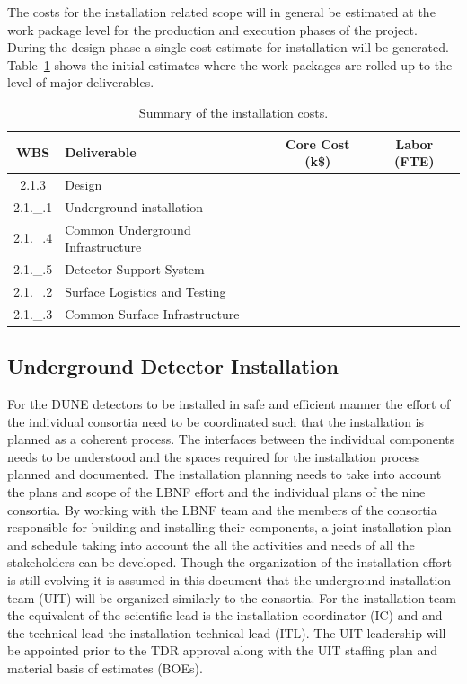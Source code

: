 The costs for the installation related scope will in general be
estimated at the work package level for the production and execution
phases of the project. During the design phase a single cost estimate
for installation will be generated. Table~\ref{Instal-Cost} shows the
initial estimates where the work packages are rolled up to the level
of major deliverables.
\begin{table}[h]
  \begin{center}
    \begin{tabular}{|c|l|c|c|}      \hline
      WBS&Deliverable&Core Cost (k\$)&Labor (FTE)\\      \hline \hline
      2.1.3&Design&&\\      \hline
      2.1.\_.1&Underground installation&&\\      \hline
      2.1.\_.4&Common Underground  Infrastructure&&\\      \hline
      2.1.\_.5& Detector Support System&&\\      \hline
      2.1.\_.2&Surface Logistics and Testing&&\\ \hline
      2.1.\_.3&Common Surface Infrastructure&&\\ \hline
    \end{tabular}
  \end{center}
  \caption{Summary of the installation costs. }
  \label{Instal-Cost}
\end{table}




\subsection{Underground Detector Installation}
\label{sec:fdsp-coord-undergd}

For the DUNE detectors to be installed in safe and efficient manner
the effort of the individual consortia need to be coordinated such
that the installation is planned as a coherent process. The interfaces
between the individual components needs to be understood and the
spaces required for the installation process planned and
documented. The installation planning needs to take into account the
plans and scope of the LBNF effort and the individual plans of the
nine consortia. By working with the LBNF team and the members of the
consortia responsible for building and installing their components, a
joint installation plan and schedule taking into account the all the
activities and needs of all the stakeholders can be developed. Though
the organization of the installation effort is still evolving it is
assumed in this document that the underground installation team (UIT) will be organized
similarly to the consortia. For the installation team the equivalent
of the scientific lead is the installation coordinator (IC) and and
the technical lead the installation technical lead (ITL). The UIT
leadership will be appointed prior to the TDR approval along with the
UIT staffing plan and material basis of estimates (BOEs).

